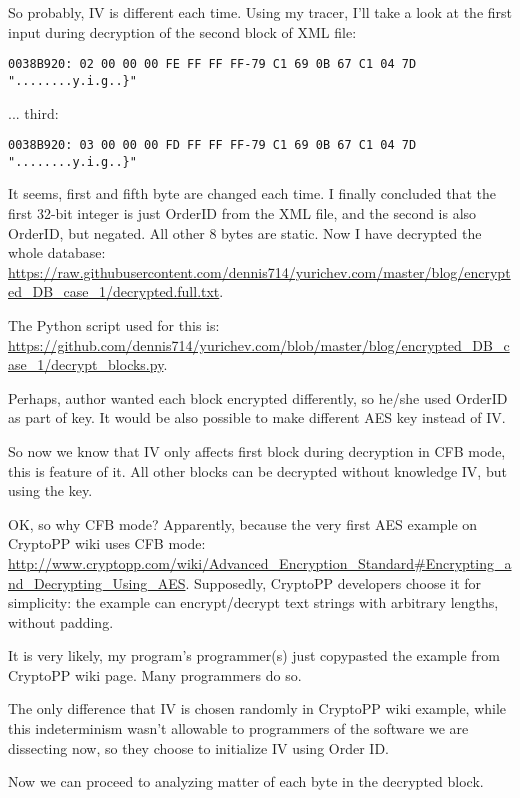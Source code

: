 So probably, IV is different each time.
Using my tracer, I'll take a look at the first input during decryption of the second block
of XML file:

\begin{lstlisting}
0038B920: 02 00 00 00 FE FF FF FF-79 C1 69 0B 67 C1 04 7D "........y.i.g..}"
\end{lstlisting}

... third:

\begin{lstlisting}
0038B920: 03 00 00 00 FD FF FF FF-79 C1 69 0B 67 C1 04 7D "........y.i.g..}"
\end{lstlisting}

It seems, first and fifth byte are changed each time.
I finally concluded that the first 32-bit integer is just OrderID from the XML file,
and the second is also OrderID, but negated. All other 8 bytes are static.
Now I have decrypted the whole database: 
\url{https://raw.githubusercontent.com/dennis714/yurichev.com/master/blog/encrypted_DB_case_1/decrypted.full.txt}.

The Python script used for this is: 
\url{https://github.com/dennis714/yurichev.com/blob/master/blog/encrypted_DB_case_1/decrypt_blocks.py}.

Perhaps, author wanted each block encrypted differently, so he/she used OrderID as part of key.
It would be also possible to make different AES key instead of IV.

So now we know that IV only affects first block during decryption in CFB mode, this is
feature of it.
All other blocks can be decrypted without knowledge IV, but using the key.

OK, so why CFB mode? Apparently, because the very first AES example on CryptoPP wiki
uses CFB mode: 
\url{http://www.cryptopp.com/wiki/Advanced_Encryption_Standard#Encrypting_and_Decrypting_Using_AES}.
Supposedly, CryptoPP developers choose it for simplicity: 
the example can encrypt/decrypt text strings with arbitrary lengths, without padding.

It is very likely, my program's programmer(s) just copypasted the example from CryptoPP wiki page.
Many programmers do so.

The only difference that IV is chosen randomly in CryptoPP wiki example, while this indeterminism
wasn't allowable to programmers of the software we are dissecting now, 
so they choose to initialize IV using Order ID.

Now we can proceed to analyzing matter of each byte in the decrypted block.

